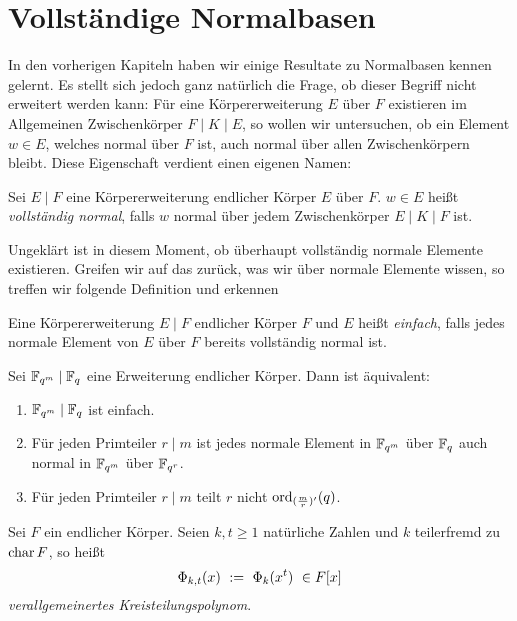 \chapter{Vollständige Normalbasen}

In den vorherigen Kapiteln haben wir einige Resultate zu Normalbasen kennen
gelernt. Es stellt sich jedoch ganz natürlich die Frage, ob dieser Begriff
nicht erweitert werden kann: Für eine Körpererweiterung $E$ über $F$ existieren
im Allgemeinen Zwischenkörper $F \mid K \mid E$, so wollen wir untersuchen,
ob ein Element $w \in E$, welches normal über $F$ ist, auch normal über allen
Zwischenkörpern bleibt. Diese Eigenschaft verdient einen eigenen Namen:

\begin{definition}
  Sei $E \mid F$ eine Körpererweiterung endlicher Körper $E$ über $F$.
  $w\in E$ heißt \emph{vollständig normal}, falls $w$ normal über jedem
  Zwischenkörper $E \mid K\mid F$ ist.
\end{definition}

Ungeklärt ist in diesem Moment, ob überhaupt vollständig normale Elemente
existieren. Greifen wir auf das zurück, was wir über normale Elemente wissen,
so treffen wir folgende Definition und erkennen 

\begin{definition}[einfach]
  \label{def:einfach}
  Eine Körpererweiterung $E \mid F$ endlicher Körper $F$ und $E$ heißt 
  \emph{einfach}, falls jedes normale Element von $E$ über $F$ bereits
  vollständig normal ist.
\end{definition}


\begin{satz}
  \label{satz:einfache_erweiterungen}
  Sei $\mathbb{F}_{q^m} \mid \mathbb{F}_q$ eine Erweiterung endlicher Körper. Dann ist
  äquivalent:
  \begin{enumerate}
    \item $\mathbb{F}_{q^m} \mid \mathbb{F}_q$ ist einfach.
    \item Für jeden Primteiler $r \mid m$ ist jedes normale Element in 
      $\mathbb{F}_{q^m}$ über $\mathbb{F}_q$ auch normal in $\mathbb{F}_{q^m}$ über $\mathbb{F}_{q^r}$.
    \item Für jeden Primteiler $r \mid m$ teilt $r$ nicht
      $\operatorname{ord}_{(\frac m r)'}(q)$.
  \end{enumerate}
\end{satz}

\begin{definition}
  Sei $F$ ein endlicher Körper. Seien $k,t\geq 1$ natürliche Zahlen und 
  $k$ teilerfremd zu $\operatorname{char} F$, so heißt
  \[ \Phi_{k,t}(x) \ :=\  \Phi_k(x^t) \ \in F[x]\]
  \emph{verallgemeinertes Kreisteilungspolynom}.
\end{definition}


